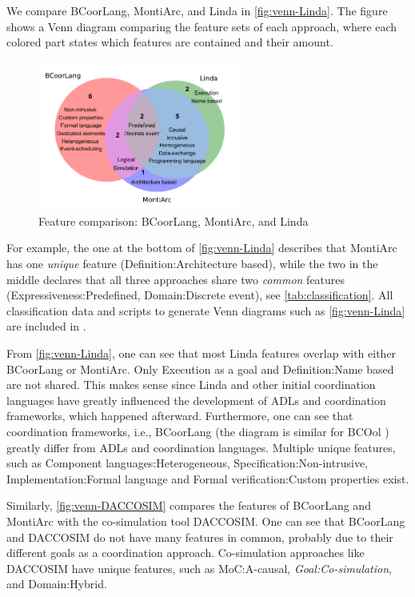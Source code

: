 \documentclass[runningheads]{llncs}
\begin{document}
We compare BCoorLang, MontiArc, and Linda in \autoref{fig:venn-Linda}.
The figure shows a Venn diagram comparing the feature sets of each approach, where each colored part states which features are contained and their amount.

\begin{figure}[ht]
	\centering
	\includegraphics[width=0.6\textwidth]{images/venn_linda}
	\caption{Feature comparison: BCoorLang, MontiArc, and Linda}
	\label{fig:venn-Linda}
\end{figure}

For example, the one at the bottom of \autoref{fig:venn-Linda} describes that MontiArc has one \textit{unique} feature (\textsf{Definition:Architecture based}), while the two in the middle declares that all three approaches share two \textit{common} features (\textsf{Expressiveness:Predefined, Domain:Discrete event}), see \autoref{tab:classification}.
All classification data and scripts to generate Venn diagrams such as \autoref{fig:venn-Linda} are included in \cite{timkrauterArtifactsCoordination2024}.

From \autoref{fig:venn-Linda}, one can see that most Linda features overlap with either BCoorLang or MontiArc.
Only \textsf{Execution} as a goal and \textsf{Definition:Name based} are not shared.
This makes sense since Linda and other initial coordination languages have greatly influenced the development of ADLs and coordination frameworks, which happened afterward.
Furthermore, one can see that coordination frameworks, i.e., BCoorLang (the diagram is similar for BCOol \cite{varalarsenBehavioralCoordinationOperator2015,varalarsenBCOolBehavioralCoordination2016}) greatly differ from ADLs and coordination languages.
Multiple unique features, such as \textsf{Component languages:Heterogeneous}, \textsf{Specification:Non-intrusive}, \textsf{Implementation:Formal language} and \textsf{Formal verification:Custom properties} exist.


Similarly, \autoref{fig:venn-DACCOSIM} compares the features of BCoorLang and MontiArc with the co-simulation tool DACCOSIM.
One can see that BCoorLang and DACCOSIM do not have many features in common, probably due to their different goals as a coordination approach.
Co-simulation approaches like DACCOSIM have unique features, such as \textsf{MoC:A-causal}, \textit{Goal:Co-simulation}, and \textsf{Domain:Hybrid}.
\end{document}
